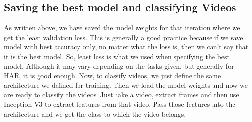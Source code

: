 \documentclass[a4paper,12pt]{article}
\begin{document}
\subsection{ Saving the best model and classifying Videos}
As written above, we have saved the model weights for that iteration where we get the least validation loss. This is generally a good practice because if we save model with best accuracy only, no matter what the loss is, then we can’t say that it is the best model. So, least loss is what we used when specifying the best model. Although it may vary depending on the tasks given, but generally for HAR, it is good enough. Now, to classify videos, we just define the same architecture we defined for training. Then we load the model weights and now we are ready to classify the videos. Just take a video, extract frames and then use Inception-V3 to extract features from that video. Pass those features into the architecture and we get the class to which the video belongs.
\end{document}

